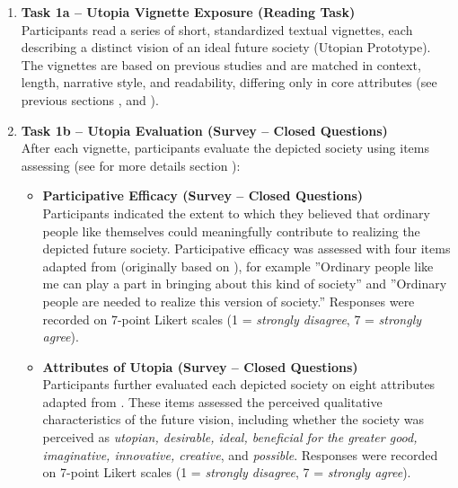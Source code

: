 \documentclass[jou,floatsintext]{apa7}
\begin{document}
\begin{enumerate}
    \item \textbf{Task 1a – Utopia Vignette Exposure (Reading Task)}\\
    Participants read a series of short, standardized textual vignettes, each describing a distinct vision of an ideal future society (Utopian Prototype). The vignettes are based on previous studies \parencite{fernandoGreensSpaceInvaders2020, fernandoProfilesIdealSociety2023}  and are matched in context, length, narrative style, and readability, differing only in core attributes (see previous sections ,  and ).
    
    \item \textbf{Task 1b – Utopia Evaluation (Survey – Closed Questions)}\\
    After each vignette, participants evaluate the depicted society using items assessing (see for more details section ):

    \begin{itemize}
        \item \textbf{Participative Efficacy (Survey – Closed Questions)}\\
        Participants indicated the extent to which they believed that ordinary people like themselves could meaningfully contribute to realizing the depicted future society. Participative efficacy was assessed with four items adapted from \textcite{fernandoGreensSpaceInvaders2020} (originally based on \textcite{vanzomerenBelievingMakingDifference2013}), for example ''Ordinary people like me can play a part in bringing about this kind of society'' and ''Ordinary people are needed to realize this version of society.'' Responses were recorded on 7-point Likert scales (1 = \textit{strongly disagree}, 7 = \textit{strongly agree}).
        \item \textbf{Attributes of Utopia (Survey – Closed Questions)}\\
        Participants further evaluated each depicted society on eight attributes adapted from \textcite{lizzio-wilsonWhatCouldBe2025}. These items assessed the perceived qualitative characteristics of the future vision, including whether the society was perceived as \textit{utopian, desirable, ideal, beneficial for the greater good, imaginative, innovative, creative}, and \textit{possible}.  Responses were recorded on 7-point Likert scales (1 = \textit{strongly disagree}, 7 = \textit{strongly agree}).
    \end{itemize}
    

\end{enumerate}
\end{document}

